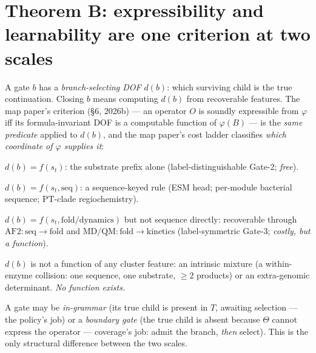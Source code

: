 \documentclass[11pt]{article}
\theoremstyle{plain}
\theoremstyle{definition}
\newcommand{\Defn}[1]{\emph{#1}}
\begin{document}
\section{Theorem B: expressibility and learnability are one criterion at two scales}
\label{sec:dual}
A gate $b$ has a \Defn{branch-selecting DOF} $d(b)$: which surviving child is the true continuation. Closing $b$ means computing $d(b)$ from recoverable features. The map paper's criterion (\S6, 2026b) --- an operator $O$ is soundly expressible from $\varphi$ iff its formula-invariant DOF is a computable function of $\varphi(B)$ --- is the \emph{same predicate} applied to $d(b)$, and the map paper's cost ladder classifies \emph{which coordinate of $\varphi$ supplies it}:
\begin{description}[leftmargin=2.4em,itemsep=1pt]
\item[Rung 1] $d(b)=f(s_t)$: the substrate prefix alone (label-distinguishable Gate-2; \emph{free}).
\item[Rung 2] $d(b)=f(s_t,\text{seq})$: a sequence-keyed rule (ESM head; per-module bacterial sequence; PT-clade regiochemistry).
\item[Rung 3] $d(b)=f(s_t,\text{fold/dynamics})$ but not sequence directly: recoverable through $\text{AF2}:\text{seq}\to\text{fold}$ and $\text{MD/QM}:\text{fold}\to\text{kinetics}$ (label-symmetric Gate-3; \emph{costly, but a function}).
\item[Rung 4] $d(b)$ is not a function of any cluster feature: an intrinsic mixture (a within-enzyme collision: one sequence, one substrate, $\geq 2$ products) or an extra-genomic determinant. \emph{No function exists.}
\end{description}

A gate may be \Defn{in-grammar} (its true child is present in $T$, awaiting selection --- the policy's job) or a \Defn{boundary gate} (the true child is absent because $\Theta$ cannot express the operator --- coverage's job: admit the branch, \emph{then} select). This is the only structural difference between the two scales.
\end{document}
